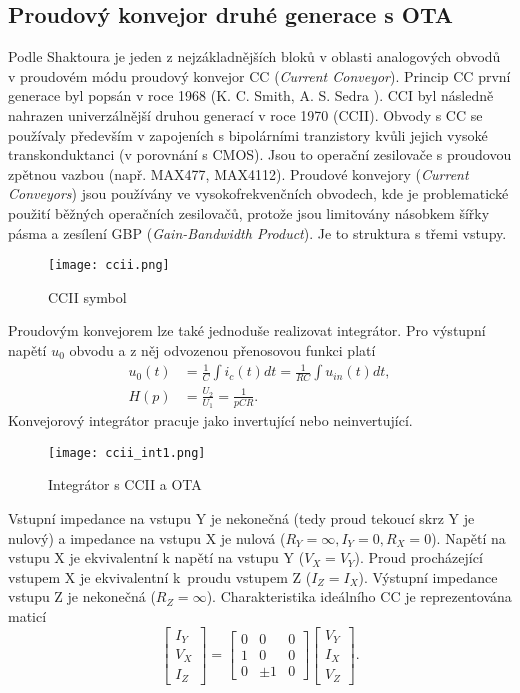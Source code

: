 \subsection{Proudový konvejor druhé generace s OTA}
Podle Shaktoura \cite{15} je jeden z nejzákladnějších bloků v oblasti analogových obvodů v proudovém módu proudový konvejor CC (\textit{Current Conveyor}). Princip CC první generace byl popsán v roce 1968 (K. C. Smith, A. S. Sedra \cite{13}). CCI byl následně nahrazen univerzálnější druhou generací v roce 1970 (CCII)\cite{14}. Obvody s CC se používaly především v zapojeních s bipolárními tranzistory kvůli jejich vysoké transkonduktanci (v porovnání s CMOS). Jsou to operační zesilovače s proudovou zpětnou vazbou (např. MAX477, MAX4112). Proudové konvejory (\textit{Current Conveyors}) jsou používány ve vysokofrekvenčních obvodech, kde je problematické použití běžných operačních zesilovačů, protože jsou limitovány násobkem šířky pásma a zesílení GBP (\textit{Gain-Bandwidth Product}). Je to struktura s třemi vstupy.
\begin{figure}[h]
\centering
\texttt{[image: ccii.png]}
\caption[CCII symbol]{CCII symbol \cite{15}}
\end{figure}
\noindent Proudovým konvejorem lze také jednoduše realizovat integrátor. Pro výstupní napětí $u_0$ obvodu a z něj odvozenou přenosovou funkci platí
\begin{align}
u_0(t) &= \frac{1}{C}\int i_c(t)dt = \frac{1}{RC}\int u_{in}(t)dt, \\
H(p) &= \frac{U_2}{U_1} = \frac{1}{pCR}.
\end{align}
\noindent Konvejorový integrátor pracuje jako invertující nebo neinvertující.
\begin{figure}[h]
\centering
\texttt{[image: ccii\_int1.png]}
\caption[Integrátor s CCII a OTA]{Integrátor s CCII a OTA \cite{10}}
\end{figure}
\noindent Vstupní impedance na vstupu Y je nekonečná (tedy proud tekoucí skrz Y je nulový) a impedance na vstupu X je nulová ($R_Y = \infty, I_Y = 0, R_X = 0$). Napětí na vstupu X je ekvivalentní k napětí na vstupu Y ($V_X = V_Y$). Proud procházející vstupem X je ekvivalentní k~proudu vstupem Z ($I_Z = I_X$). Výstupní impedance vstupu Z je nekonečná ($R_Z = \infty$).
Charakteristika ideálního CC je reprezentována maticí
\begin{equation}
\begin{bmatrix}
I_Y \\ V_X \\ I_Z
\end{bmatrix}
=
\begin{bmatrix}
0 & 0 & 0 \\
1 & 0 & 0 \\
0 & \pm 1 & 0 
\end{bmatrix}
\begin{bmatrix}
V_Y \\
I_X \\
V_Z
\end{bmatrix}.
\end{equation}
